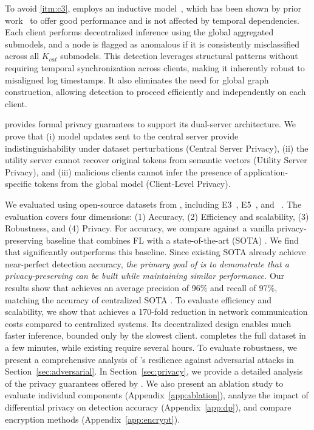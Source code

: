   To avoid \ref{itm:c3}, \Sys employs an inductive \gnnshort model~\cite{hamilton2017inductive}, which has been shown by prior work~\cite{flash2024,shadewatcher,wang2022threatrace} to offer good performance and is not affected by temporal dependencies. Each client performs decentralized inference using the global aggregated submodels, and a node is flagged as anomalous if it is consistently misclassified across all \( K_{cat} \) submodels. This detection leverages structural patterns without requiring temporal synchronization across clients, making it inherently robust to misaligned log timestamps. It also eliminates the need for global graph construction, allowing detection to proceed efficiently and independently on each client.


 \Sys provides formal privacy guarantees to support its dual-server architecture. We prove that (i) model updates sent to the central server provide indistinguishability under dataset perturbations (Central Server Privacy), (ii) the utility server cannot recover original tokens from semantic vectors (Utility Server Privacy), and (iii) malicious clients cannot infer the presence of application-specific tokens from the global model (Client-Level Privacy).



We evaluated \Sys using open-source datasets from \darpa, including E3~\cite{error3}, E5~\cite{bug5}, and \optc~\cite{anjum2021analyzing}. The evaluation covers four dimensions: (1) Accuracy, (2) Efficiency and scalability, (3) Robustness, and (4) Privacy. For accuracy, we compare \Sys against a vanilla privacy-preserving \pids baseline that combines FL with a state-of-the-art (SOTA) \pids. We find that \Sys significantly outperforms this baseline. Since existing SOTA \pids already achieve near-perfect detection accuracy, {\it the primary goal of \Sys is to demonstrate that a privacy-preserving \pids can be built while maintaining similar performance.} Our results show that \Sys achieves an average precision of 96\% and recall of 97\%, matching the accuracy of centralized SOTA \pids. To evaluate efficiency and scalability, we show that \Sys achieves a 170-fold reduction in network communication costs compared to centralized systems. Its decentralized design enables much faster inference, bounded only by the slowest client. \Sys completes the full \optc dataset in a few minutes, while existing \pids require several hours. To evaluate robustness, we present a comprehensive analysis of \Sys’s resilience against adversarial attacks in Section~\ref{sec:adversarial}. In Section~\ref{sec:privacy}, we provide a detailed analysis of the privacy guarantees offered by \Sys. We also present an ablation study to evaluate individual components (Appendix~\ref{app:ablation}), analyze the impact of differential privacy on detection accuracy (Appendix~\ref{app:dp}), and compare encryption methods (Appendix~\ref{app:encrypt}).


